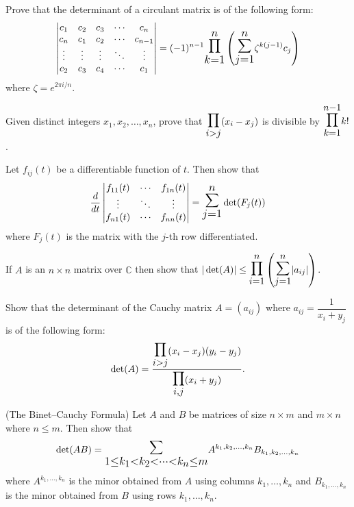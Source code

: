 \documentclass[12pt]{article}
\let\oldsum\sum
\let\oldprod\prod
\renewcommand{\sum}{\mathlarger{\mathlarger{\oldsum}}}
\renewcommand{\prod}{\mathlarger{\mathlarger{\oldprod}}}
\begin{document}
\begin{problem}
Prove that the determinant of a circulant matrix is of the following form:
\[
\begin{vmatrix}
c_1 & c_2 & c_3 & \cdots & c_n\\
c_n & c_1 & c_2 & \cdots & c_{n-1}\\
\vdots & \vdots & \vdots & \ddots & \vdots\\
c_2 & c_3 & c_4 & \cdots & c_1
\end{vmatrix} = (-1)^{n-1}\prod_{k=1}^n \left(\sum_{j=1}^n \zeta^{k(j-1)}c_j\right)
\]
where $\zeta = e^{2\pi i/n}$.
\end{problem}

\begin{problem}
Given distinct integers $x_1,x_2,\dots,x_n$, prove that $\prod_{i>j}(x_i-x_j)$ is divisible by $\prod_{k=1}^{n-1} k!$.
\end{problem}

\begin{problem}
Let $f_{ij}(t)$ be a differentiable function of $t$. Then show that
\[
\frac{d}{dt}\begin{vmatrix} f_{11}(t) & \cdots & f_{1n}(t)\\ \vdots & \ddots & \vdots\\ f_{n1}(t) & \cdots & f_{nn}(t)\end{vmatrix} = \sum_{j=1}^n \det(F_j(t))
\]
where $F_j(t)$ is the matrix with the $j$-th row differentiated.
\end{problem}

\begin{problem}
If $A$ is an $n\times n$ matrix over $\mathbb{C}$ then show that $|\det(A)| \le \prod_{i=1}^n\left(\sum_{j=1}^n |a_{ij}|\right)$.
\end{problem}

\begin{problem}
Show that the determinant of the Cauchy matrix $A=(a_{ij})$ where $a_{ij}=\dfrac{1}{x_i+y_j}$ is of the following form:
\[
\det(A) = \frac{\prod_{i>j}(x_i-x_j)(y_i-y_j)}{\prod_{i,j}(x_i+y_j)}.
\]
\end{problem}

\begin{problem}
(The Binet--Cauchy Formula) Let $A$ and $B$ be matrices of size $n\times m$ and $m\times n$ where $n\le m$. Then show that
\[
\det(AB) = \sum_{1\le k_1<k_2<\cdots<k_n\le m} A^{k_1,k_2,\dots,k_n}B_{k_1,k_2,\dots,k_n}
\]
where $A^{k_1,\dots,k_n}$ is the minor obtained from $A$ using columns $k_1,\dots,k_n$ and $B_{k_1,\dots,k_n}$ is the minor obtained from $B$ using rows $k_1,\dots,k_n$.
\end{problem}
\end{document}
